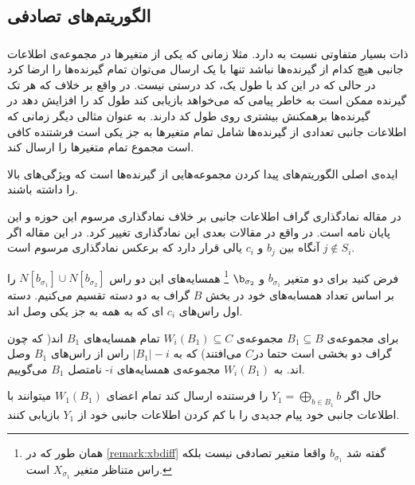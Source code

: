 \subsection{
الگوریتم‌های تصادفی
}
\subsubsection{
}
\picod
ذات بسیار متفاوتی نسبت به
\icod
دارد. مثلا زمانی که یکی از متغیرها در مجموعه‌ی اطلاعات جانبی هیچ کدام از گیرنده‌ها نباشد تنها با یک ارسال می‌توان تمام گیرنده‌ها را ارضا کرد در حالی که در
\icod
این کد با طول یک، کد درستی نیست. در واقع بر خلاف
\icod
که هر تک گیرنده ممکن است به خاطر پیامی که می‌خواهد بازیابی کند طول کد را افزایش دهد در
\picod
گیرنده‌ها برهمکنش بیشتری روی طول کد دارند. به عنوان مثالی دیگر زمانی که اطلاعات جانبی تعدادی از گیرنده‌ها شامل تمام متغیرها به جز یکی است فرشتنده کافی است مجموع تمام متغیرها را ارسال کند. 

ایده‌ی اصلی الگوریتم‌های
 پیدا کردن مجموعه‌هایی از گیرنده‌ها است که ویژگی‌های بالا را داشته باشند.
 
 \begin{remark}
 	در مقاله
 	\cite{pliablefirstpaper}
 	نمادگذاری گراف اطلاعات جانبی بر خلاف نمادگذاری مرسوم این حوزه و این پایان نامه است. در واقع در مقالات بعدی این نمادگذاری تغییر کرد. در این مقاله اگر
 	$j \notin S_i$
 	آنگاه بین
 	$b_j$
 	و
 	$c_i$
 	یالی قرار دارد که برعکس نمادگذاری مرسوم است.
 \end{remark}
 
 فرض کنید برای دو متغیر
 $b_{\sigma_1}$
 و
 $\b_{\sigma_2}$
 \footnote{
 همان طور که در
 \autoref{remark:xbdiff}
 گفته شد 
 $b_{\sigma_1}$
 واقعا متغیر تصادفی نیست بلکه راس متناظر متغیر
 $X_{\sigma_1}$
 است.
 }
 همسایه‌های این دو راس
 $N[b_{\sigma_1}] \cup N[b_{\sigma_2}]$
 را بر اساس تعداد همسابه‌های خود در بخش
 $B$
 گراف به دو دسته تقسیم می‌کنیم. دسته اول راس‌های
 $c_i$
 ای که به همه به جز یکی وصل اند. 
 \begin{definition}
 برای مجموعه‌ی
 $B_1 \subseteq B$
 مجموعه‌ی
 $W_i(B_1) \subseteq C$
 تمام همسایه‌های
 $B_1$
 اند( که چون گراف دو بخشی است حتما در$C$ می‌افتند) که به 
 $|B_1| - i$
 راس از راس‌های
 $B_1$
  وصل اند. به
  $W_i(B_1)$
  مجموعه‌ی همسایه‌های
  $i$-
  نامتصل 
  $B_1$
  می‌گوییم.
  \end{definition}
  حال اگر
  $Y_1 = \bigoplus\limits_{b \in B_1} b$
  را فرستنده ارسال کند تمام اعضای
  $W_1(B_1)$
  میتوانند با اطلاعات جانبی خود پیام جدیدی را با کم کردن اطلاعات جانبی خود از
  $Y_1$
  بازیابی کنند.
  
